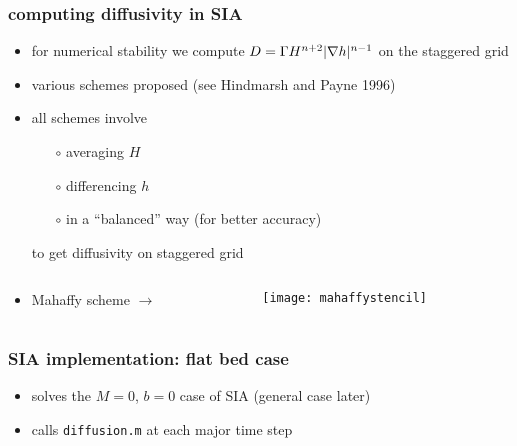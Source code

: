 \begin{frame}
  \frametitle{computing diffusivity in SIA}

\begin{itemize}
\item for numerical stability we compute $D = \Gamma H^{n+2} |\nabla h|^{n-1}$ on the staggered grid
\item various schemes proposed (see Hindmarsh and Payne 1996)
\item all schemes involve
  \begin{itemize}
  \item[$\circ$] averaging $H$
  \item[$\circ$] differencing $h$
  \item[$\circ$] in a ``balanced'' way (for better accuracy)
  \end{itemize}
to get diffusivity on staggered grid
\end{itemize}

\begin{columns}
\begin{column}{0.6\textwidth}
\begin{itemize}
\item Mahaffy scheme \large $\to$ \normalsize
\end{itemize}
\end{column}

\begin{column}{0.4\textwidth}
  \texttt{[image: mahaffystencil]}
\end{column}
\end{columns}
\end{frame}


\begin{frame}
  \frametitle{SIA implementation: flat bed case}


\vspace{-2mm}
\begin{itemize}
\item solves the $M=0$, $b=0$ case of SIA \quad \small (general case later) \normalsize
\item calls \texttt{diffusion.m} at each major time step
\end{itemize}
\end{frame}


